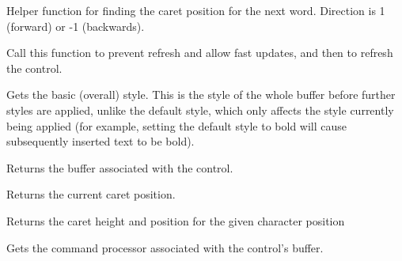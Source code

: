 Helper function for finding the caret position for the next word. Direction
is 1 (forward) or -1 (backwards).

\label{wxrichtextctrlfreeze}


Call this function to prevent refresh and allow fast updates, and then  to
refresh the control.

\label{wxrichtextctrlgetbasicstyle}


Gets the basic (overall) style. This is the style of the whole
buffer before further styles are applied, unlike the default style, which
only affects the style currently being applied (for example, setting the default
style to bold will cause subsequently inserted text to be bold).

\label{wxrichtextctrlgetbuffer}



Returns the buffer associated with the control.

\label{wxrichtextctrlgetcaretposition}


Returns the current caret position.

\label{wxrichtextctrlgetcaretpositionforindex}


Returns the caret height and position for the given character position

\label{wxrichtextctrlgetcommandprocessor}


Gets the command processor associated with the control's buffer.

\label{wxrichtextctrlgetdefaultstyleex}


